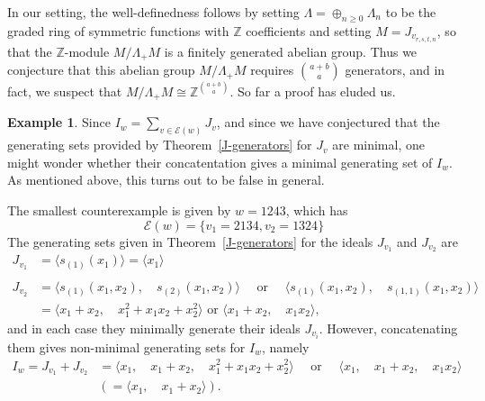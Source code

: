 \documentclass[12pt,dvips]{amsart}
\theoremstyle{plain}
\theoremstyle{definition}
\newtheorem{example}[theorem]{Example}
\theoremstyle{remark}
\numberwithin{equation}{section}
\def\Ess{{\mathcal{E}}}
\begin{document}
In our setting, the well-definedness follows by setting
$\Lambda=\oplus_{n\geq 0}\Lambda_{n}$ to be the graded ring of
symmetric functions with ${\mathbb Z}$ coefficients and setting
$M=J_{v_{r,s,t,n}}$, so that the ${\mathbb Z}$-module $M/\Lambda_{+}M$
is a finitely generated abelian group.
%
%
Thus we conjecture that this abelian group $M/ \Lambda_+ M$ requires
$\binom{a+b}{a}$ generators, and in fact, we suspect that
$M/\Lambda_{+}M\cong {\mathbb Z}^{\binom{a+b}{a}}$.  So far a proof
has eluded us.


\begin{example}
\label{non-minimal-example}
Since $I_w=\sum_{v \in \Ess(w)} J_v$, and since we have
conjectured that the generating sets provided by Theorem~\ref{J-generators}
for $J_v$ are minimal, one might wonder whether their
concatentation gives a minimal generating set of $I_w$.  As mentioned above, this turns
out to be false in general.

The smallest counterexample is given by $w=1243$, which has
$$
\Ess(w) = \{v_1 = 2134, v_2=1324\}
$$
The generating sets given in Theorem~\ref{J-generators} for the ideals $J_{v_1}$ and $J_{v_2}$ are
$$
\begin{aligned}
J_{v_1} &= \langle s_{(1)}(x_1) \rangle 
       = \langle x_1 \rangle \\
       & \\
J_{v_2} &= \langle s_{(1)}(x_1,x_2), \quad s_{(2)}(x_1,x_2) \rangle 
           \quad \text{ or } \quad \langle s_{(1)}(x_1,x_2), \quad s_{(1,1)}(x_1,x_2) \rangle  \\
       &= \langle x_1+x_2, \quad x_1^2+x_1 x_2+x_2^2  \rangle
            \text{ or }\langle  x_1+x_2, \quad x_1 x_2 \rangle,
\end{aligned}
$$
and in each case they minimally generate their ideals $J_{v_i}$.
However, concatenating them gives non-minimal generating sets for $I_w$, namely
$$
\begin{aligned}
I_w = J_{v_1}+J_{v_2} &= \langle x_1, \quad x_1+x_2,\quad x_1^2+x_1 x_2+x_2^2 \rangle 
                      \quad \text{ or } \quad \langle x_1, \quad x_1+x_2, \quad x_1 x_2 \rangle  \\
                       &   \left( = \langle x_1, \quad  x_1+x_2 \rangle \right) .
\end{aligned}
$$
\end{example}
\end{document}
